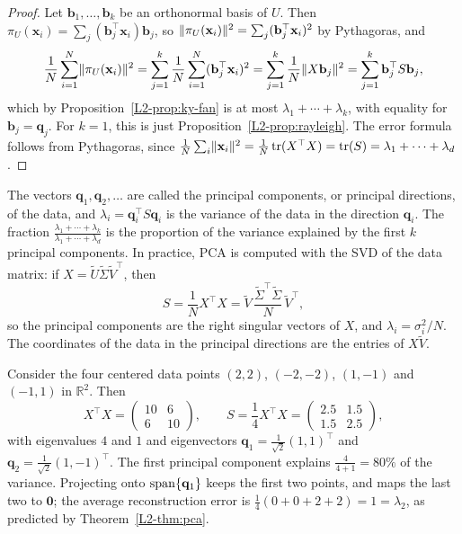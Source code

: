 \begin{proof}
    Let $\mathbf{b}_1, \ldots, \mathbf{b}_k$ be an orthonormal basis of $U$. Then $\pi_U(\mathbf{x}_i) = \sum_j (\mathbf{b}_j^\top \mathbf{x}_i) \mathbf{b}_j$, so $\lVert \pi_U(\mathbf{x}_i) \rVert^2 = \sum_j (\mathbf{b}_j^\top \mathbf{x}_i)^2$ by Pythagoras, and
    \[\frac{1}{N}\sum_{i=1}^N \lVert \pi_U(\mathbf{x}_i) \rVert^2 = \sum_{j=1}^k \frac{1}{N}\sum_{i=1}^N (\mathbf{b}_j^\top \mathbf{x}_i)^2 = \sum_{j=1}^k \frac{1}{N}\lVert X\mathbf{b}_j \rVert^2 = \sum_{j=1}^k \mathbf{b}_j^\top S \mathbf{b}_j,\]
    which by Proposition~\ref{L2-prop:ky-fan} is at most $\lambda_1 + \cdots + \lambda_k$, with equality for $\mathbf{b}_j = \mathbf{q}_j$. For $k = 1$, this is just Proposition~\ref{L2-prop:rayleigh}. The error formula follows from Pythagoras, since $\frac{1}{N}\sum_i \lVert \mathbf{x}_i \rVert^2 = \frac{1}{N}\operatorname{tr}(X^\top X) = \operatorname{tr}(S) = \lambda_1 + \cdots + \lambda_d$.
\end{proof}

The vectors $\mathbf{q}_1, \mathbf{q}_2, \ldots$ are called the principal components, or principal directions, of the data, and $\lambda_i = \mathbf{q}_i^\top S \mathbf{q}_i$ is the variance of the data in the direction $\mathbf{q}_i$. The fraction $\frac{\lambda_1 + \cdots + \lambda_k}{\lambda_1 + \cdots + \lambda_d}$ is the proportion of the variance explained by the first $k$ principal components. In practice, PCA is computed with the SVD of the data matrix: if $X = \tilde{U} \tilde{\Sigma} \tilde{V}^\top$, then
\[S = \frac{1}{N} X^\top X = \tilde{V}\, \frac{\tilde{\Sigma}^\top \tilde{\Sigma}}{N}\, \tilde{V}^\top,\]
so the principal components are the right singular vectors of $X$, and $\lambda_i = \sigma_i^2 / N$. The coordinates of the data in the principal directions are the entries of $X\tilde{V}$.

\begin{example}\label{L2-ex:pca}
    Consider the four centered data points $(2, 2)$, $(-2, -2)$, $(1, -1)$ and $(-1, 1)$ in $\mathbb{R}^2$. Then
    \[X^\top X = \begin{pmatrix} 10 & 6 \\ 6 & 10 \end{pmatrix}, \qquad S = \frac{1}{4} X^\top X = \begin{pmatrix} 2.5 & 1.5 \\ 1.5 & 2.5 \end{pmatrix},\]
    with eigenvalues $4$ and $1$ and eigenvectors $\mathbf{q}_1 = \frac{1}{\sqrt{2}}(1, 1)^\top$ and $\mathbf{q}_2 = \frac{1}{\sqrt{2}}(1, -1)^\top$. The first principal component explains $\frac{4}{4 + 1} = 80\%$ of the variance. Projecting onto $\operatorname{span}\{\mathbf{q}_1\}$ keeps the first two points, and maps the last two to $\mathbf{0}$; the average reconstruction error is $\frac{1}{4}(0 + 0 + 2 + 2) = 1 = \lambda_2$, as predicted by Theorem~\ref{L2-thm:pca}.
\end{example}

